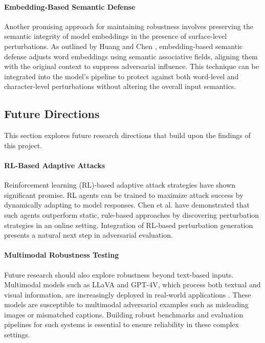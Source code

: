 \documentclass[conference]{IEEEtran}
\begin{document}
\paragraph{Embedding-Based Semantic Defense}
Another promising approach for maintaining robustness involves preserving the semantic integrity of model embeddings in the presence of surface-level perturbations. As outlined by Huang and Chen \cite{huang2024semantic}, embedding-based semantic defense adjusts word embeddings using semantic associative fields, aligning them with the original context to suppress adversarial influence. This technique can be integrated into the model’s pipeline to protect against both word-level and character-level perturbations without altering the overall input semantics.

\subsection{Future Directions}

This section explores future research directions that build upon the findings of this project.

\paragraph{RL-Based Adaptive Attacks}
Reinforcement learning (RL)-based adaptive attack strategies have shown significant promise. RL agents can be trained to maximize attack success by dynamically adapting to model responses. Chen et al. \cite{chen2025worstcase} have demonstrated that such agents outperform static, rule-based approaches by discovering perturbation strategies in an online setting. Integration of RL-based perturbation generation presents a natural next step in adversarial evaluation.

\paragraph{Multimodal Robustness Testing}
Future research should also explore robustness beyond text-based inputs. Multimodal models such as LLaVA and GPT-4V, which process both textual and visual information, are increasingly deployed in real-world applications \cite{wsj2025securityrisks}. These models are susceptible to multimodal adversarial examples such as misleading images or mismatched captions. Building robust benchmarks and evaluation pipelines for such systems is essential to ensure reliability in these complex settings\cite{wsj2025securityrisks}.
\end{document}

